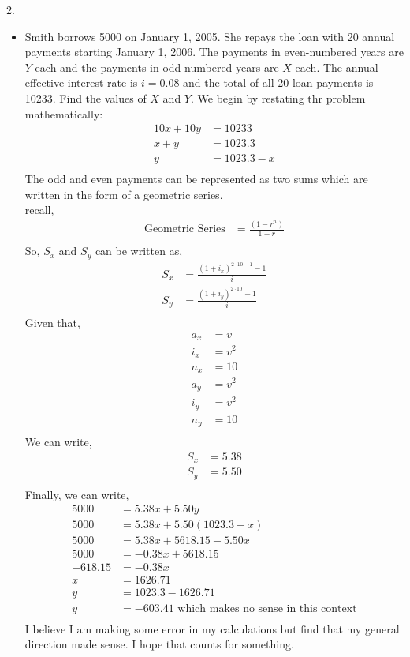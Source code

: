 \documentclass[12pt]{article}
\begin{document}
2. 
\begin{itemize}
    \item  Smith borrows 5000 on January 1, 2005. She repays the loan with 20 annual payments starting January 1, 2006. The payments in even-numbered years are $Y$ each and the payments in odd-numbered years are $X$ each. The annual effective interest rate is $i = 0.08$ and the total of all 20 loan payments is 10233. Find the values of $X$ and $Y$.
	We begin by restating thr problem mathematically:\\
	\begin{align*}
	    10x+10y &= 10233\\
	    x+y &= 1023.3\\
	    y &= 1023.3-x\\
	\end{align*}
	The odd and even payments can be represented as two sums which are written in the form of a geometric series.\\
	recall,\\
	\begin{align*}
	    \text{Geometric Series} &= \frac{(1-r^n)}{1-r}\\
	\end{align*}
	So, $S_x$ and $S_y$ can be written as,\\
	\begin{align*}
	    S_x &= \frac{(1+i_x)^{2\cdot10-1}-1}{i}\\
	    S_y &= \frac{(1+i_y)^{2\cdot10}-1}{i}\\
	\end{align*}
	Given that,\\
	\begin{align*}
		a_x &=v\\
		i_x &=v^2\\
		n_x &= 10\\
		a_y &=v^2\\
		i_y &=v^2\\
		n_y &= 10\\
	\end{align*}
	We can write,\\
	\begin{align*}
		S_x&=5.38\\
		S_y&=5.50\\
	\end{align*}
	Finally, we can write,\\
	\begin{align*}
	    5000 &= 5.38x+5.50y\\
	    5000 &= 5.38x+5.50(1023.3-x)\\
	    5000 &= 5.38x+5618.15-5.50x\\
	    5000 &= -0.38x+5618.15\\
	    -618.15 &= -0.38x\\
	    x &= 1626.71\\
	    y &= 1023.3-1626.71\\
	    y &= -603.41 \text{ which makes no sense in this context}\\
	\end{align*}
	I believe I am making some error in my calculations but find that my general direction made sense. I hope that counts for something.
\end{itemize}
\end{document}
